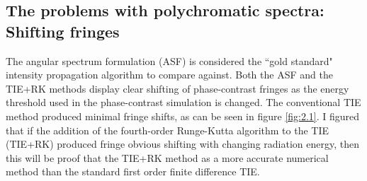 \documentclass[10pt, a4paper, singlespacing]{report}
\begin{document}
\subsection{The problems with polychromatic spectra: Shifting fringes}\label{betterthan}
The angular spectrum formulation (ASF) is considered the ``gold standard" intensity propagation algorithm to compare against. Both the ASF and the TIE+RK methods display clear shifting of phase-contrast fringes as the energy threshold used in the phase-contrast simulation is changed. The conventional TIE method produced minimal fringe shifts, as can be seen in figure \ref{fig:2.1}. I figured that if the addition of the fourth-order Runge-Kutta algorithm to the TIE (TIE+RK) produced fringe obvious shifting with changing radiation energy, then this will be proof that the TIE+RK method as a more accurate numerical method than the standard first order finite difference TIE.
\end{document}
